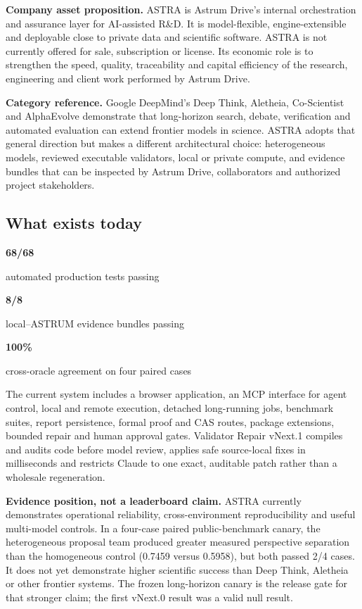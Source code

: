 \documentclass[10pt,a4paper]{article}
\newcommand{\metric}[2]{%
  \begin{minipage}[t]{0.31\linewidth}
  \centering
  {\LARGE\bfseries\color{tealblue}#1}\par
  \vspace{1mm}
  {\scriptsize\color{slate}#2}
  \end{minipage}
}
\begin{document}
\begin{keybox}
\textbf{Company asset proposition.} ASTRA is Astrum Drive's internal orchestration
and assurance layer for AI-assisted R\&D. It is model-flexible, engine-extensible and
deployable close to private data and scientific software. ASTRA is not currently
offered for sale, subscription or license. Its economic role is to strengthen the
speed, quality, traceability and capital efficiency of the research, engineering and
client work performed by Astrum Drive.
\end{keybox}

\begin{plainbox}
\textbf{Category reference.} Google DeepMind's Deep Think, Aletheia,
Co-Scientist and AlphaEvolve demonstrate that long-horizon search, debate,
verification and automated evaluation can extend frontier models in science.
ASTRA adopts that general direction but makes a different architectural choice:
heterogeneous models, reviewed executable validators, local or private compute,
and evidence bundles that can be inspected by Astrum Drive, collaborators and
authorized project stakeholders.
\end{plainbox}

\subsection*{What exists today}

\metric{68/68}{automated production tests passing}
\hfill
\metric{8/8}{local--ASTRUM evidence bundles passing}
\hfill
\metric{100\%}{cross-oracle agreement on four paired cases}

\vspace{4mm}
The current system includes a browser application, an MCP interface for agent control,
local and remote execution, detached long-running jobs, benchmark suites, report
persistence, formal proof and CAS routes, package extensions, bounded repair and human
approval gates. Validator Repair vNext.1 compiles and audits code before model review,
applies safe source-local fixes in milliseconds and restricts Claude to one exact,
auditable patch rather than a wholesale regeneration.

\begin{keybox}
\textbf{Evidence position, not a leaderboard claim.} ASTRA currently demonstrates
operational reliability, cross-environment reproducibility and useful multi-model
controls. In a four-case paired public-benchmark canary, the heterogeneous proposal
team produced greater measured perspective separation than the homogeneous control
(0.7459 versus 0.5958), but both passed 2/4 cases. It does not yet demonstrate higher
scientific success than Deep Think, Aletheia or other frontier systems. The frozen
long-horizon canary is the release gate for that stronger claim; the first vNext.0
result was a valid null result.
\end{keybox}
\end{document}

